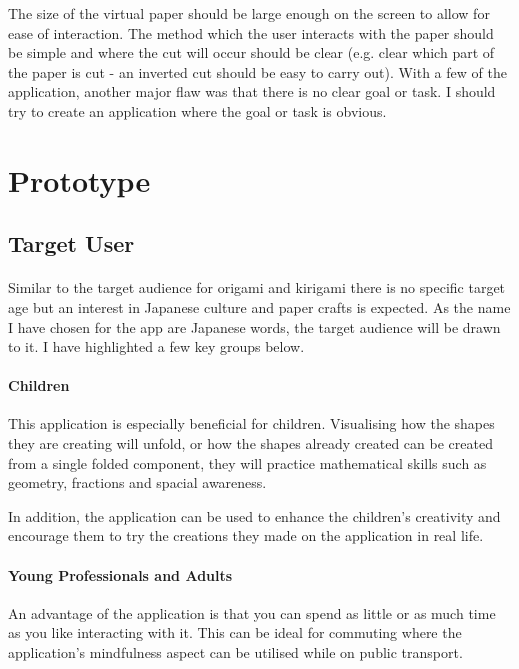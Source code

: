 \documentclass[11pt]{article}
\begin{document}
            The size of the virtual paper should be large enough on the screen to allow for ease of interaction. The method which the user interacts with the paper should be simple and where the cut will occur should be clear (e.g. clear which part of the paper is cut - an inverted cut should be easy to carry out). 
            With a few of the application, another major flaw was that there is no clear goal or task. I should try to create an application where the goal or task is obvious.


\newpage
\section{Prototype}

    \subsection{Target User}
    
            \paragraph{}
            Similar to the target audience for origami and kirigami there is no specific target age but an interest in Japanese culture and paper crafts is expected. As the name I have chosen for the app are Japanese words, the target audience will be drawn to it. I have highlighted a few key groups below. 
            
            \paragraph{Children}
            This application is especially beneficial for children. Visualising how the shapes they are creating will unfold, or how the shapes already created can be created from a single folded component, they will practice mathematical skills such as geometry, fractions and spacial awareness.
            
            In addition, the application can be used to enhance the children's creativity and encourage them to try the creations they made on the application in real life. 
            
            \paragraph{Young Professionals and Adults}
            An advantage of the application is that you can spend as little or as much time as you like interacting with it. This can be ideal for commuting where the application's mindfulness aspect can be utilised while on public transport.
\end{document}
